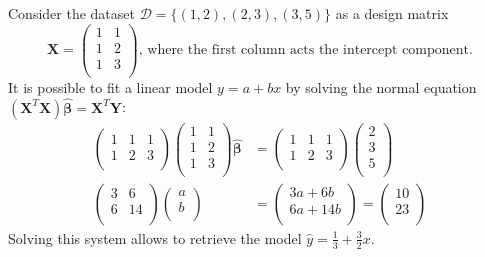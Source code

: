 \documentclass{report}
\begin{document}
\begin{examplebox}
    Consider the dataset $\displaystyle \mathcal{D} = \{(1, 2), (2, 3), (3, 5)\}$ as a design matrix
    \[\mathbf{X} = \begin{pmatrix}
        1 & 1 \\
        1 & 2 \\
        1 & 3 \\
    \end{pmatrix} \text{, where the first column acts the intercept component.}\]
    It is possible to fit a linear model $\displaystyle y = a + bx$ by solving the normal equation $\displaystyle (\mathbf{X}^T\mathbf{X})\hat{\mathbf{\beta}} = \mathbf{X}^T\mathbf{Y}$:
    \begin{align*}
        \begin{pmatrix}
            1 & 1 & 1 \\
            1 & 2 & 3 \\
        \end{pmatrix}\begin{pmatrix}
            1 & 1 \\
            1 & 2 \\
            1 & 3 \\
        \end{pmatrix}\hat{\mathbf{\beta}} &= \begin{pmatrix}
            1 & 1 & 1 \\
            1 & 2 & 3 \\
        \end{pmatrix}\begin{pmatrix}
            2 \\
            3 \\
            5 \\
        \end{pmatrix} \\
        \begin{pmatrix}
            3 & 6 \\
            6 & 14 \\
        \end{pmatrix}\begin{pmatrix}
            a \\
            b \\
        \end{pmatrix} &= \begin{pmatrix}
            3a + 6b \\
            6a + 14b \\
        \end{pmatrix} = \begin{pmatrix}
            10 \\
            23 \\
        \end{pmatrix}
    \end{align*}
    Solving this system allows to retrieve the model $\displaystyle \hat{y} = \frac{1}{3} + \frac{3}{2}x$.
\end{examplebox}
\end{document}
